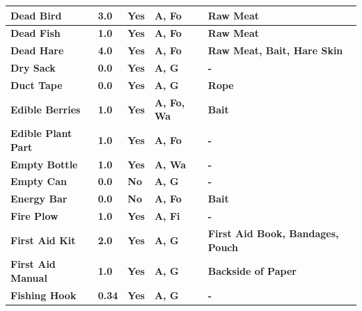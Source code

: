 \begin{longtable}{|C{10.555em}|C{4.0em}|C{4.0em}|C{6.445em}|C{11.055em}|}
			    \midrule
			     \textbf{Dead Bird} & \textbf{3.0} & \textbf{Yes} & \textbf{A, Fo} & \textbf{Raw Meat} \\
			    \midrule
			     \textbf{Dead Fish} & \textbf{1.0} & \textbf{Yes} & \textbf{A, Fo} & \textbf{Raw Meat} \\
			    \midrule
			     \textbf{Dead Hare} & \textbf{4.0} & \textbf{Yes} & \textbf{A, Fo} & \textbf{Raw Meat, Bait, Hare Skin} \\
			    \midrule
			     \textbf{Dry Sack} & \textbf{0.0} & \textbf{Yes} & \textbf{A, G} & \textbf{-} \\
			    \midrule
			     \textbf{Duct Tape} & \textbf{0.0} & \textbf{Yes} & \textbf{A, G} & \textbf{Rope} \\
			    \midrule
			     \textbf{Edible Berries} & \textbf{1.0} & \textbf{Yes} & \textbf{A, Fo, Wa} & \textbf{Bait} \\
			    \midrule
			     \textbf{Edible Plant Part} & \textbf{1.0} & \textbf{Yes} & \textbf{A, Fo} & \textbf{-} \\
			    \midrule
			     \textbf{Empty Bottle} & \textbf{1.0} & \textbf{Yes} & \textbf{A, Wa} & \textbf{-} \\
			    \midrule
			     \textbf{Empty Can} & \textbf{0.0} & \textbf{No} & \textbf{A, G} & \textbf{-} \\
			    \midrule
			     \textbf{Energy Bar} & \textbf{0.0} & \textbf{No} & \textbf{A, Fo} & \textbf{Bait} \\
			    \midrule
			     \textbf{Fire Plow} & \textbf{1.0} & \textbf{Yes} & \textbf{A, Fi} & \textbf{-} \\
			    \midrule
			     \textbf{First Aid Kit} & \textbf{2.0} & \textbf{Yes} & \textbf{A, G} & \textbf{First Aid Book, Bandages, Pouch} \\
			    \midrule
			     \textbf{First Aid Manual} & \textbf{1.0} & \textbf{Yes} & \textbf{A, G} & \textbf{Backside of Paper} \\
			    \midrule
			     \textbf{Fishing Hook} & \textbf{0.34} & \textbf{Yes} & \textbf{A, G} & \textbf{-} \\

\end{longtable}
